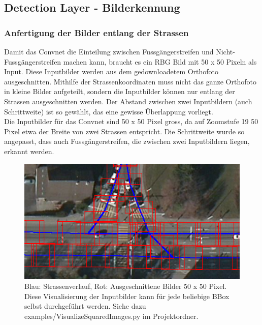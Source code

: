 
\subsection{Detection Layer - Bilderkennung}

\subsubsection{Anfertigung der Bilder entlang der Strassen}
Damit das Convnet die Einteilung zwischen Fussgängerstreifen und Nicht-Fussgängerstreifen machen kann, braucht es ein RBG Bild mit 50 x 50 Pixeln als Input. Diese \Gls{Inputbild}er werden aus dem gedownloadetem Orthofoto ausgeschnitten. Mithilfe der Strassenkoordinaten muss nicht das ganze Orthofoto in kleine Bilder aufgeteilt, sondern die Inputbilder können nur entlang der Strassen ausgeschnitten werden. Der Abstand zwischen zwei Inputbildern (auch Schrittweite) ist so gewählt, das eine gewisse Überlappung vorliegt.\\

Die Inputbilder für das Convnet sind 50 x 50 Pixel gross, da auf Zoomstufe 19 50 Pixel etwa der Breite von zwei Strassen entspricht. Die Schrittweite wurde so angepasst, dass auch Fussgängerstreifen, die zwischen zwei Inputbildern liegen, erkannt werden.

\begin{figure}[H]
	\centering
	\includegraphics{images/squared_images.png}
	\caption[Anfertigung Inputbilder]{Blau: Strassenverlauf, Rot: Ausgeschnittene Bilder 50 x 50 Pixel. Diese Visualisierung der Inputbilder kann für jede beliebige BBox selbst durchgeführt werden. Siehe dazu examples/VisualizeSquaredImages.py im Projektordner.}
\end{figure}



